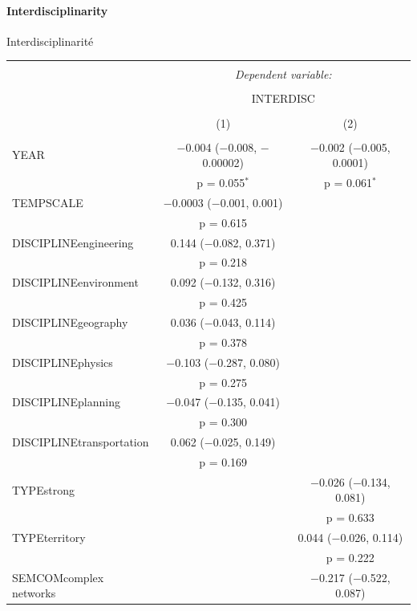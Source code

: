 \paragraph{Interdisciplinarity}{Interdisciplinarité}




\begin{table}[!htbp] \centering 
  \appcaption{}{}
\begin{tabular}{@{\extracolsep{5pt}}lcc} 
\\[-1.8ex]\hline 
\hline \\[-1.8ex] 
 & \multicolumn{2}{c}{\textit{Dependent variable:}} \\ 
\cline{2-3} 
\\[-1.8ex] & \multicolumn{2}{c}{INTERDISC} \\ 
\\[-1.8ex] & (1) & (2)\\ 
\hline \\[-1.8ex] 
 YEAR & $-$0.004 ($-$0.008, $-$0.00002) & $-$0.002 ($-$0.005, 0.0001) \\ 
  & p = 0.055$^{*}$ & p = 0.061$^{*}$ \\ 
  TEMPSCALE & $-$0.0003 ($-$0.001, 0.001) &  \\ 
  & p = 0.615 &  \\ 
  DISCIPLINEengineering & 0.144 ($-$0.082, 0.371) &  \\ 
  & p = 0.218 &  \\ 
  DISCIPLINEenvironment & 0.092 ($-$0.132, 0.316) &  \\ 
  & p = 0.425 &  \\ 
  DISCIPLINEgeography & 0.036 ($-$0.043, 0.114) &  \\ 
  & p = 0.378 &  \\ 
  DISCIPLINEphysics & $-$0.103 ($-$0.287, 0.080) &  \\ 
  & p = 0.275 &  \\ 
  DISCIPLINEplanning & $-$0.047 ($-$0.135, 0.041) &  \\ 
  & p = 0.300 &  \\ 
  DISCIPLINEtransportation & 0.062 ($-$0.025, 0.149) &  \\ 
  & p = 0.169 &  \\ 
  TYPEstrong &  & $-$0.026 ($-$0.134, 0.081) \\ 
  &  & p = 0.633 \\ 
  TYPEterritory &  & 0.044 ($-$0.026, 0.114) \\ 
  &  & p = 0.222 \\ 
  SEMCOMcomplex networks &  & $-$0.217 ($-$0.522, 0.087) \\ 

\end{tabular}
\end{table}
